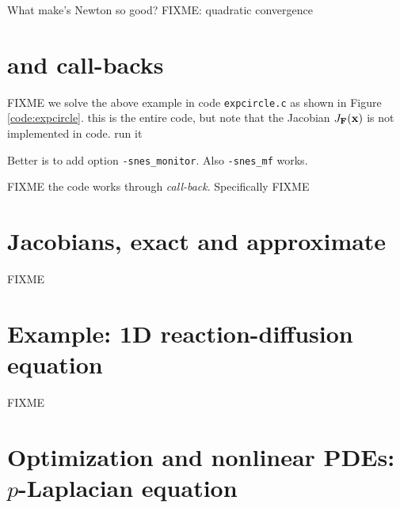 What make's Newton so good?  FIXME: quadratic convergence


\section{\pSNES and call-backs}

FIXME  we solve the above example in code \texttt{expcircle.c} as shown in Figure \ref{code:expcircle}.  this is the entire code, but note that the Jacobian $J_{\mathbf{F}}(\mathbf{x})$ is not implemented in code.  run it
Better is to add option \texttt{-snes\_monitor}.  Also \texttt{-snes\_mf} works.

FIXME the code works through \emph{call-back}.  Specifically FIXME

\vfill
{}


\section{Jacobians, exact and approximate}

FIXME

\vfill
{}



\section{Example: 1D reaction-diffusion equation}

FIXME

\vfill
{}




\section{Optimization and nonlinear PDEs: $p$-Laplacian equation}

